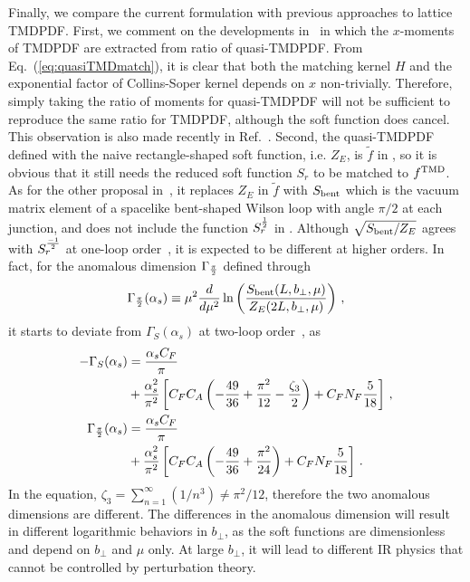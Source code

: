 Finally, we compare the current formulation with previous approaches to lattice TMDPDF. First, we comment on the developments in~\cite{Hagler:2009mb,Musch:2010ka,Musch:2011er,Engelhardt:2015xja,Yoon:2017qzo} in which the $x$-moments of TMDPDF are extracted from ratio of quasi-TMDPDF.  From Eq.~(\ref{eq:quasiTMDmatch}), it is clear that both the matching kernel $H$ and the exponential factor of Collins-Soper kernel depends on $x$ non-trivially. Therefore, simply taking the ratio of moments for quasi-TMDPDF will not be sufficient to reproduce the same ratio for TMDPDF, although the soft function does cancel. This observation is also made recently in Ref.~\cite{Ebert:2020gxr}. Second, the quasi-TMDPDF defined with the naive rectangle-shaped soft function, i.e. $Z_E$, is $\tilde f$ in , so it is obvious that it still needs the reduced soft function $S_r$ to be matched to $f^{\rm TMD}$. As for the other proposal in~\cite{Ji:2014hxa,Ebert:2019okf}, it replaces $Z_E$ in $\tilde f$ with $S_{\rm bent}$ which is the vacuum matrix element of a spacelike bent-shaped Wilson loop with angle $\pi/2$ at each junction, and does not include the function $S^{1\over2}_r$ in . Although $\sqrt{S_{\rm bent}/Z_E}$ agrees with $S_r^{-1\over2}$ at one-loop order~\cite{Ji:2018hvs,Ebert:2019okf}, it is expected to be different at higher orders. In fact, for the anomalous dimension $\Gamma_{\pi\over2}$ defined through
\begin{align}
	\Gamma_{\frac{\pi}{2}}(\alpha_s) \equiv \mu^2\frac{d}{d\mu^2} \ln \left(\frac{S_{\rm bent}(L,b_\perp,\mu)}{Z_E(2L,b_\perp,\mu)}\right) \,,
\end{align}
it starts to deviate from $\Gamma_S(\alpha_s)$ at two-loop order~\cite{Grozin:2015kna}, as
\begin{align}
	-\Gamma_S(\alpha_s)&=\frac{\alpha_sC_F}{\pi} \\
	&+\frac{\alpha_s^2}{\pi^2}\left[C_FC_A\left(-\frac{49}{36}+\frac{\pi^2}{12}-\frac{\zeta_3}{2}\right)+C_FN_F\frac{5}{18}\right]  \,, \nonumber \\
	\Gamma_{\frac{\pi}{2}}(\alpha_s)&=\frac{\alpha_sC_F}{\pi} \\
	&+\frac{\alpha_s^2}{\pi^2}\left[C_FC_A\left(-\frac{49}{36}+\frac{\pi^2}{24}\right)+C_FN_F\frac{5}{18}\right] \,. \nonumber
\end{align}
In the equation, $\zeta_3=\sum_{n=1}^{\infty}(1/n^3) \ne \pi^2/12$, therefore the two anomalous dimensions are different. The differences in the anomalous dimension will result in different logarithmic behaviors in $b_\perp$, as the soft functions are dimensionless and depend on $b_\perp$ and $\mu$ only. At large $b_\perp$, it will lead to different IR physics that cannot be controlled by perturbation theory.

